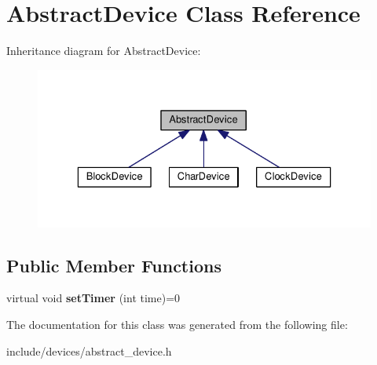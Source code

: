 \hypertarget{classAbstractDevice}{\section{\-Abstract\-Device \-Class \-Reference}
\label{db/d0e/classAbstractDevice}
}


\-Inheritance diagram for \-Abstract\-Device\-:\nopagebreak
\begin{figure}[H]
\begin{center}
\leavevmode
\includegraphics[width=329pt]{dd/d4d/classAbstractDevice__inherit__graph}
\end{center}
\end{figure}
\subsection*{\-Public \-Member \-Functions}
\begin{DoxyCompactItemize}
\item 
\hypertarget{classAbstractDevice_a393c627235e10b16507161febe32cae0}{virtual void {\bfseries set\-Timer} (int time)=0}\label{db/d0e/classAbstractDevice_a393c627235e10b16507161febe32cae0}

\end{DoxyCompactItemize}


\-The documentation for this class was generated from the following file\-:\begin{DoxyCompactItemize}
\item 
include/devices/abstract\-\_\-device.\-h\end{DoxyCompactItemize}
